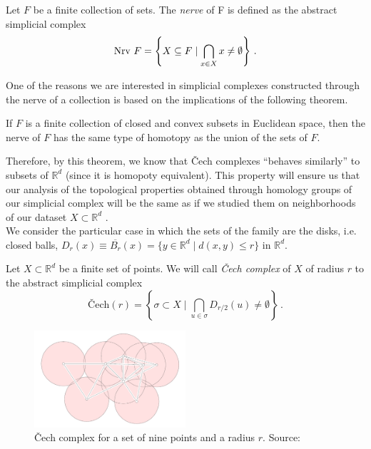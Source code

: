 \documentclass[../main.tex]{subfiles}
\begin{document}
\begin{definition}
Let $F$ be a finite collection of sets. The \emph{nerve} of F is defined as the abstract simplicial complex
\[
{\rm Nrv}\ F= \left\{ X \subseteq F \mid \bigcap_{x\in X} x \neq \emptyset \right\}\,.
\]
\end{definition}

One of the reasons we are interested in simplicial complexes constructed through the nerve of a collection is based on the implications of the following theorem.

\begin{theorem}
If $F$ is a finite collection of closed and convex subsets in Euclidean space, then the nerve of $F$ has the same type of homotopy as the union of the sets of $F$.
\end{theorem}
Therefore, by this theorem, we know that \v{C}ech complexes ``behaves similarly'' to subsets of $\mathbb{R}^d$ (since it is homopoty equivalent). This property will ensure us that our analysis of the topological properties obtained through homology groups of our simplicial complex will be the same as if we studied them on neighborhoods of our dataset $X\subset \mathbb{R}^d$ \cite{doherty_cech_2018}.\\

We consider the particular case in which the sets of the family are the disks, i.e. closed balls, $D_r(x)\equiv\overline{B_r}(x)= \{y\in \mathbb{R}^d \mid d(x, y) \leq r\}$ in $\mathbb{R}^d$.

\begin{definition}
Let $X\subset \mathbb{R}^d$ be a finite set of points. We will call \emph{\v{C}ech complex} of $X$ of radius $r$ to the abstract simplicial complex
\[
\text{\v{C}ech}(r)=\left\{\sigma \subset X \mid \bigcap_{u \in \sigma} D_{r/2}(u)\neq \emptyset \right\}\,.
\]
\end{definition}

\begin{figure}[!ht]
\centering
\includegraphics[width=0.5\textwidth]{figures/bg/Cech.png} 
\caption{\v{C}ech complex for a set of nine points and a radius $r$. Source: \cite{edelsbrunner_computational_2010}}
\label{fig:cech}
\end{figure}
\end{document}
